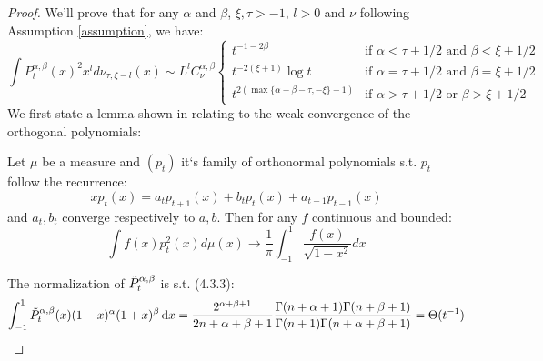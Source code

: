 \documentclass{article}
\begin{document}
\begin{proof}
We'll prove that for any $\alpha$ and $\beta$, $\xi,\tau>-1$, $l>0$ and $\nu$ following Assumption \ref{assumption}, we have:
\begin{equation*}
    \int P_t^{\alpha,\beta}(x)^2x^l d\nu_{\tau,\xi-l}(x) \sim  L^lC^{\alpha,\beta}_\nu\left\{
	\begin{array}{ll}
		  t^{-1-2\beta}& \mbox{if } 
		  \alpha<\tau+1/2 \text{ and } \beta <\xi+1/2\\
		  t^{-2(\xi+1)}\log t& \mbox{if } 
		  \alpha=\tau+1/2 \text{ and } \beta =\xi+1/2\\
		  t^{2(\max\{\alpha-\beta-\tau,-\xi\}-1)}& \mbox{if } 
		  \alpha>\tau+1/2 \text{ or } \beta >\xi+1/2
	\end{array}
\right.
\end{equation*}
We first state a lemma shown in \cite{van1995weak} relating to the weak convergence of the orthogonal polynomials:

\begin{lemma}
 Let $\mu$ be a measure and $(p_t)$ it`s family of orthonormal polynomials s.t.  $p_t$ follow the recurrence:
 \begin{equation*}
     xp_t(x)=a_tp_{t+1}(x)+b_tp_t(x)+a_{t-1}p_{t-1}(x)
 \end{equation*}
 and $a_t,b_t$ converge respectively to $a,b$. Then for any $f$  continuous and bounded:
\begin{equation}
    \int f(x)p_t^2(x)d\mu(x) \rightarrow \frac{1}{\pi}\int_{-1}^1 \frac{f(x)}{\sqrt{1-x^2}}dx   
\end{equation}
\label{wk}
\end{lemma} The normalization of $\Tilde{P}^{\alpha,\beta} _t$ is s.t. \cite{szego1975orthogonal} (4.3.3):
\begin{equation}
    \int_{-1}^1\Tilde{P}_t^{\alpha,\beta}(x)(1-x)^\alpha(1+x)^\beta \mathop{}\!\mathrm{d} x=\frac{2^{\alpha+\beta+1}}{2n+\alpha+\beta+1}\frac{\Gamma(n+\alpha+1)\Gamma(n+\beta+1)}{\Gamma(n+1)\Gamma(n+\alpha+\beta+1)}=\Theta(t^{-1})
\end{equation}


\end{proof}
\end{document}
